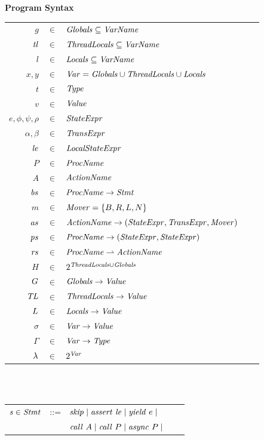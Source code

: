 \begin{figure}
\setlength{\tabcolsep}{3pt}
{\bf Program Syntax} \\
\begin{tabular}{rclcl}
$g$ & $\in$ & $\mathit{Globals} \subseteq \mathit{VarName}$ \\
$\mathit{tl}$ & $\in$ & $\mathit{ThreadLocals} \subseteq \mathit{VarName}$ \\
$l$ & $\in$ & $\mathit{Locals} \subseteq \mathit{VarName}$ \\
$x,y$ & $\in$ & $\mathit{Var} = \mathit{Globals} \cup \mathit{ThreadLocals} \cup \mathit{Locals}$ \\
$t$ & $\in$ & $\mathit{Type}$ \\
$v$ &  $\in$ & $\mathit{Value}$ \\
$e, \phi, \psi, \rho$ & $\in$ & $\mathit{StateExpr}$ \\
$\alpha, \beta$ & $\in$ & $\mathit{TransExpr}$ \\
$\mathit{le}$ & $\in$ & $\mathit{LocalStateExpr}$ \\
$P$ & $\in$ & $\mathit{ProcName}$ \\
$A$ & $\in$ & $\mathit{ActionName}$ \\
$\mathit{bs}$ & $\in$ & $\mathit{ProcName} \rightarrow \mathit{Stmt}$ \\
$m$ & $\in$ & $\mathit{Mover} = \{B,R,L,N\}$\\
$\mathit{as}$ & $\in$ & $\mathit{ActionName} \rightarrow (\mathit{StateExpr}, \mathit{TransExpr}, \mathit{Mover})$ \\
$\mathit{ps}$ & $\in$ & $\mathit{ProcName} \rightarrow (\mathit{StateExpr}, \mathit{StateExpr})$ \\
$\mathit{rs}$ & $\in$ & $\mathit{ProcName} \rightharpoonup \mathit{ActionName}$ \\
$H$ & $\in$ & $2^{\mathit{ThreadLocals} \cup \mathit{Globals}}$ \\
$G$ & $\in$ & $ \mathit{Globals} \rightarrow \mathit{Value}$ \\
$\mathit{TL}$ & $\in$ & $ \mathit{ThreadLocals}  \rightarrow \mathit{Value}$ \\
$L$ & $\in$ & $ \mathit{Locals} \rightarrow \mathit{Value}$ \\
$\sigma$ & $\in$ & $ \mathit{Var} \rightarrow \mathit{Value}$ \\
$\Gamma$ & $\in$ & $ \mathit{Var} \rightarrow \mathit{Type}$ \\
$\lambda$ & $\in$ & $2^{\mathit{Var}}$ \\
\end{tabular}
~\\
~\\
\begin{tabular}{rclcl}
$\mathit{s} \in \mathit{Stmt}$ &::= & $\mathit{skip} \mid \mathit{assert}\ \mathit{le} \mid \mathit{yield}\ e \mid$ \\
                  & & $\mathit{call}\ A \mid \mathit{call}\ P \mid \mathit{async}\ P \mid $\\

\end{tabular}
\end{figure}
